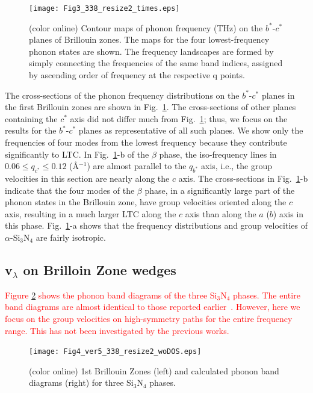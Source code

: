 \documentclass[twocolumn,amsmath,amssymb,a4paper,prb,superscriptaddress,floatfix]{revtex4-1}
\begin{document}
\begin{figure}[ht]
 \begin{center}
  \texttt{[image: Fig3\_338\_resize2\_times.eps]} \caption{(color
  online) Contour maps of phonon frequency (THz) on the $b^*$-$c^*$
  planes of Brillouin zones. The maps for the four lowest-frequency
  phonon states are shown. The frequency landscapes are formed by simply
  connecting the frequencies of the same band indices, assigned by
  ascending order of frequency at the respective q
  points. \label{fig:Fig3_338} }
 \end{center}
\end{figure}

The cross-sections of the phonon frequency distributions on the
$b^*$-$c^*$ planes in the first Brillouin zones are shown in
Fig.~\ref{fig:Fig3_338}. The cross-sections of other planes containing
the $c^*$ axis did not differ much from Fig.~\ref{fig:Fig3_338}; thus,
we focus on the results for the $b^*$-$c^*$ planes as representative of
all such planes. We show only the frequencies of four modes from the
lowest frequency because they contribute significantly to LTC. In
Fig.~\ref{fig:Fig3_338}-b of the $\beta$ phase, the iso-frequency lines
in $0.06 \le q_{c^*} \le 0.12$ (\AA$^{-1}$) are almost parallel to the
$q_{b^*}$ axis, i.e., the group velocities in this section are nearly
along the $c$ axis. The cross-sections in Fig.~\ref{fig:Fig3_338}-b
indicate that the four modes of the $\beta$ phase, in a significantly
large part of the phonon states in the Brillouin zone, have group
velocities oriented along the $c$ axis, resulting in a much larger LTC
along the $c$ axis than along the $a$ ($b$) axis in this
phase. Fig.~\ref{fig:Fig3_338}-a shows that the frequency distributions
and group velocities of $\alpha$-Si$_3$N$_4$ are fairly isotropic.

\subsection{v$_\lambda$ on Brilloin Zone wedges}


\textcolor{red}{Figure \ref{fig:Fig4_ver5_338} shows the phonon band diagrams 
of the three Si$_3$N$_4$ phases.
The entire band diagrams are almost identical to those reported earlier~\cite{kuwabara,xu}.
However, here we focus on the group velocities on high-symmetry paths for the 
entire frequency range. This has not been investigated by the previous works. 
}

\begin{figure}[ht]
 \begin{center}
  \texttt{[image: Fig4\_ver5\_338\_resize2\_woDOS.eps]}
  \caption{(color online) 1st Brillouin Zones (left) and calculated phonon band diagrams (right) for three Si$_3$N$_4$ phases.
  \label{fig:Fig4_ver5_338} }
 \end{center}
\end{figure}
\end{document}
